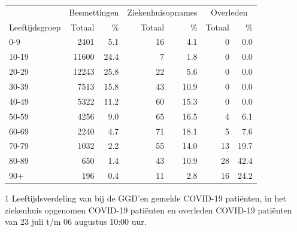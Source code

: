 \documentclass[
  english,
  man,floatsintext]{apa6}
\begin{document}
\begin{table}
\centering\begingroup\fontsize{11}{13}\selectfont

\begin{threeparttable}
\begin{tabular}{lrrrrrr}
\toprule
\multicolumn{1}{c}{ } & \multicolumn{2}{c}{Besmettingen} & \multicolumn{2}{c}{Ziekenhuisopnames} & \multicolumn{2}{c}{Overleden} \\
\cmidrule(l{3pt}r{3pt}){2-3} \cmidrule(l{3pt}r{3pt}){4-5} \cmidrule(l{3pt}r{3pt}){6-7}
Leeftijdsgroep & Totaal & \% & Totaal & \% & Totaal & \%\\
\midrule
0-9 & 2401 & 5.1 & 16 & 4.1 & 0 & 0.0\\
10-19 & 11600 & 24.4 & 7 & 1.8 & 0 & 0.0\\
20-29 & 12243 & 25.8 & 22 & 5.6 & 0 & 0.0\\
30-39 & 7513 & 15.8 & 43 & 10.9 & 0 & 0.0\\
40-49 & 5322 & 11.2 & 60 & 15.3 & 0 & 0.0\\
50-59 & 4256 & 9.0 & 65 & 16.5 & 4 & 6.1\\
60-69 & 2240 & 4.7 & 71 & 18.1 & 5 & 7.6\\
70-79 & 1032 & 2.2 & 55 & 14.0 & 13 & 19.7\\
80-89 & 650 & 1.4 & 43 & 10.9 & 28 & 42.4\\
90+ & 196 & 0.4 & 11 & 2.8 & 16 & 24.2\\
\bottomrule
\end{tabular}
\begin{tablenotes}
\item[1] Leeftijdsverdeling van bij de GGD’en gemelde COVID-19 patiënten, in het ziekenhuis opgenomen COVID-19 patiënten en overleden COVID-19 patiënten van 23 juli t/m 06 augustus 10:00 uur.
\end{tablenotes}
\end{threeparttable}
\endgroup{}
\end{table}

\newpage
\end{document}
